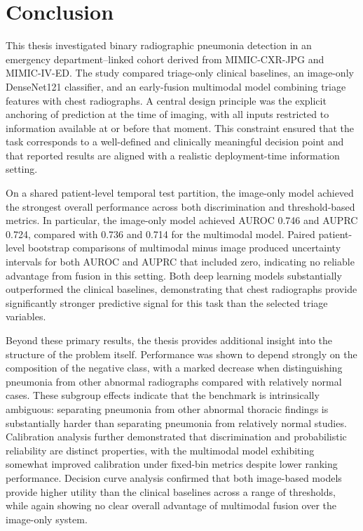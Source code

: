 \chapter{Conclusion}

This thesis investigated binary radiographic pneumonia detection in an emergency department--linked cohort derived from MIMIC-CXR-JPG and MIMIC-IV-ED. The study compared triage-only clinical baselines, an image-only DenseNet121 classifier, and an early-fusion multimodal model combining triage features with chest radiographs. A central design principle was the explicit anchoring of prediction at the time of imaging, with all inputs restricted to information available at or before that moment. This constraint ensured that the task corresponds to a well-defined and clinically meaningful decision point and that reported results are aligned with a realistic deployment-time information setting.

On a shared patient-level temporal test partition, the image-only model achieved the strongest overall performance across both discrimination and threshold-based metrics. In particular, the image-only model achieved AUROC 0.746 and AUPRC 0.724, compared with 0.736 and 0.714 for the multimodal model. Paired patient-level bootstrap comparisons of multimodal minus image produced uncertainty intervals for both AUROC and AUPRC that included zero, indicating no reliable advantage from fusion in this setting. Both deep learning models substantially outperformed the clinical baselines, demonstrating that chest radiographs provide significantly stronger predictive signal for this task than the selected triage variables.

Beyond these primary results, the thesis provides additional insight into the structure of the problem itself. Performance was shown to depend strongly on the composition of the negative class, with a marked decrease when distinguishing pneumonia from other abnormal radiographs compared with relatively normal cases. These subgroup effects indicate that the benchmark is intrinsically ambiguous: separating pneumonia from other abnormal thoracic findings is substantially harder than separating pneumonia from relatively normal studies. Calibration analysis further demonstrated that discrimination and probabilistic reliability are distinct properties, with the multimodal model exhibiting somewhat improved calibration under fixed-bin metrics despite lower ranking performance. Decision curve analysis confirmed that both image-based models provide higher utility than the clinical baselines across a range of thresholds, while again showing no clear overall advantage of multimodal fusion over the image-only system.

